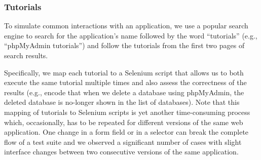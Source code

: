


\subsubsection{Tutorials}
\label{sec:tutorials}
To simulate common interactions with an application, we use a popular search
engine to search for the application's name followed by the word ``tutorials''
(e.g., ``phpMyAdmin tutorials'') and follow the tutorials from the first two
pages of search results.

Specifically, we map each tutorial to a Selenium script that allows us to
both execute the same tutorial multiple times and also assess the correctness
of the results (e.g., encode that when we delete a database using phpMyAdmin,
the deleted database is no-longer shown in the list of databases). Note that
this mapping of tutorials to Selenium scripts is yet another time-consuming
process which, occasionally, has to be repeated for different versions of
the same web application. One change in a form field or in a selector can
break the complete flow of a test suite and we observed a significant number
of cases with slight interface changes between two consecutive versions of
the same application.

